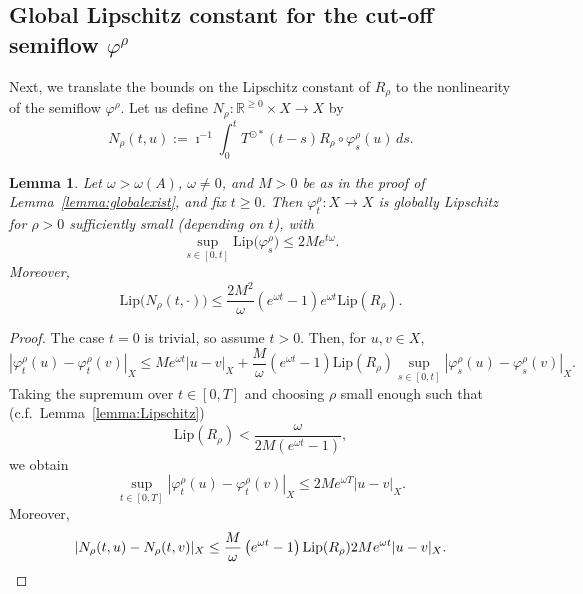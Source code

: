 \documentclass[a4paper, 12pt, oneside, reqno, notitlepage]{amsart}
\theoremstyle{plain}
\newtheorem{lemma}[theorem]{Lemma}
\theoremstyle{definition}
\theoremstyle{remark}
\newcommand{\lip}{\mathrm{Lip}}
\begin{document}
\subsection{Global Lipschitz constant for the cut-off semiflow \texorpdfstring{$\varphi^\rho$}{}}

Next, we translate the bounds on the Lipschitz constant of $R_\rho$ to the nonlinearity of the semiflow $\varphi^\rho$.
Let us define $N_\rho: \mathbb{R}^{\geq 0} \times X \to X$ by
\begin{displaymath}
    N_\rho(t,u ) := \imath^{-1} \int_0^t T^{\odot *}(t-s) R_\rho \circ \varphi_s^\rho(u) \, ds.
\end{displaymath} 

\begin{lemma} \label{lemma:nonlinearity_sf}
    Let $\omega > \omega(A)$, $\omega \neq 0$, and $M>0$ be as in the proof of Lemma~\ref{lemma:globalexist}, and fix $t \geq 0$.
    Then $\varphi_t^\rho : X \to X$ is globally Lipschitz for $\rho > 0$ sufficiently small (depending on $t$), with
    \begin{displaymath}
       \sup_{s \in [0,t]} \lip\big( \varphi_s^\rho\big) \leq 2M e^{t \omega}.
    \end{displaymath}
    Moreover,
    \begin{equation}
         \lip\big(N_\rho(t,\cdot)\big) \leq \frac{2M^2}{\omega} \left( e^{\omega t} - 1 \right)  e^{\omega t} \lip(R_\rho).
         \label{eq:LipN}
    \end{equation}
\end{lemma}

\begin{proof}
    The case $t =0$ is trivial, so assume $t > 0$.
    Then, for $u,v \in X$,
    \begin{displaymath}
        |\varphi_t^\rho (u) - \varphi_t^\rho(v)|_X \leq Me^{\omega t}  |u-v|_X + \frac{M}{\omega} \left( e^{\omega t} - 1 \right) \lip(R_\rho) \sup_{s \in [0,t]}  |\varphi_s^\rho (u) - \varphi_s^\rho(v)|_X.
    \end{displaymath}
    Taking the supremum over $t \in [0,T]$ and choosing $\rho$ small enough such that (c.f.\ Lemma~\ref{lemma:Lipschitz})
    \begin{equation}
        \lip(R_\rho) < \frac{\omega}{ 2 M \left( e^{\omega t} - 1 \right)},
        \label{eq:replaced}
    \end{equation}
    we obtain 
    \begin{displaymath}
        \sup_{t \in [0,T]} |\varphi_t^\rho (u) - \varphi_t^\rho(v)|_X \leq 2Me^{\omega T}  |u-v|_X .
    \end{displaymath}
    Moreover, 
    \begin{displaymath}
        |N_\rho(t,u ) - N_\rho(t,v)|_X \leq \frac{M}{\omega} \left( e^{\omega t} - 1 \right) \lip(R_\rho) 2Me^{\omega t}  |u-v|_X. \qedhere
    \end{displaymath}
\end{proof}
\end{document}

